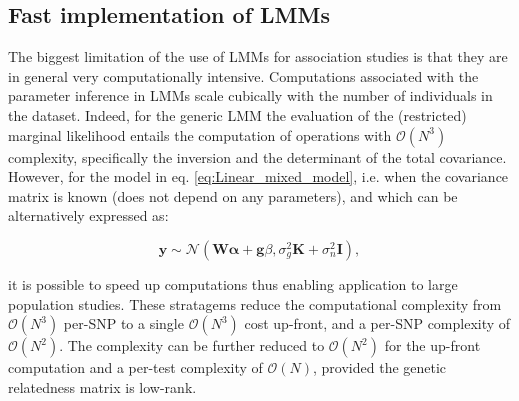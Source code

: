 \newpage

\subsection{Fast implementation of LMMs}
\label{sec:fast_lmm}

The biggest limitation of the use of LMMs for association studies is that they are in general very computationally intensive.
Computations associated with the parameter inference in LMMs scale cubically with
the number of individuals in the dataset. 
Indeed, for the generic LMM
the evaluation of the (restricted) marginal likelihood entails the computation of operations with $\mathcal{O}(N^3)$ complexity, specifically the inversion and the determinant of the total covariance. %
However, for the model in eq. \eqref{eq:Linear_mixed_model}, i.e. when the covariance matrix is known (does not depend on any parameters), and which can be alternatively expressed as:

\begin{equation}\label{eq:LMM_MVN}
 \mathbf{y} \sim  \mathcal{N}(\mathbf{W}\boldsymbol{\alpha} + \mathbf{g}\beta, \sigma_g^2\mathbf{K} + \sigma_n^2\mathbf{I}),
\end{equation}

it is possible to speed up computations \cite{kang2008efficient, kang2010variance, lippert2011fast, zhou2012genome} thus enabling application to large population studies. 
These stratagems reduce the computational complexity from $\mathcal{O}(N^3)$
per-SNP to a single  $\mathcal{O}(N^3)$ cost up-front, and a per-SNP complexity of  $\mathcal{O}(N^2)$.
The complexity can be further reduced to $\mathcal{O}(N^2)$ for the up-front computation and a per-test complexity of  $\mathcal{O}(N)$, provided the genetic relatedness matrix is low-rank. \\



